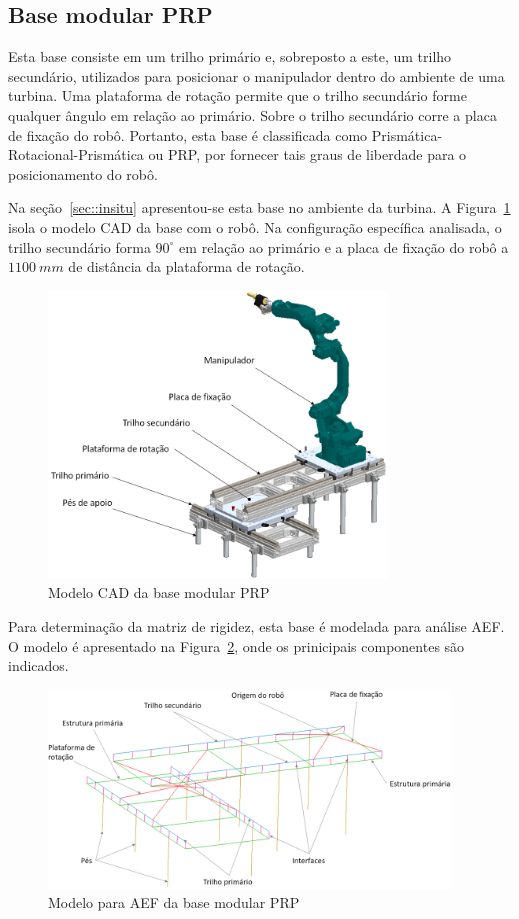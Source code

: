 \subsection{Base modular PRP} \label{sec::base_prp}

Esta base consiste em um trilho primário e, sobreposto a este, um trilho
secundário, utilizados para posicionar o manipulador dentro do ambiente de uma
turbina.
Uma plataforma de rotação permite que o trilho secundário forme qualquer ângulo
em relação ao primário. Sobre o trilho secundário corre a placa de fixação do
robô. Portanto, esta base é classificada como Prismática-Rotacional-Prismática
ou PRP, por fornecer tais graus de liberdade para o posicionamento do robô.

Na seção~\ref{sec::insitu} apresentou-se esta base no ambiente da turbina.
A Figura~\ref{fig::prp_cad} isola o modelo CAD da base com o robô. Na
configuração específica analisada, o trilho secundário forma $90^\circ$
em relação ao primário e a placa de fixação do robô a $1100~mm$ de distância da
plataforma de rotação.

\begin{figure}[h]
	\centering 
 	\includegraphics[width=0.80\textwidth]{figs/prp_cad}
 	\caption{Modelo CAD da base modular PRP}
 	\label{fig::prp_cad}
\end{figure}

Para determinação da matriz de rigidez, esta base é modelada para análise AEF. O
modelo é apresentado na Figura~\ref{fig::prp_fea}, onde os prinicipais
componentes são indicados.

\begin{figure}[h]
	\centering 
 	\includegraphics[width=0.95\textwidth]{figs/prp_fea}
 	\caption{Modelo para AEF da base modular PRP}
 	\label{fig::prp_fea}
\end{figure}

